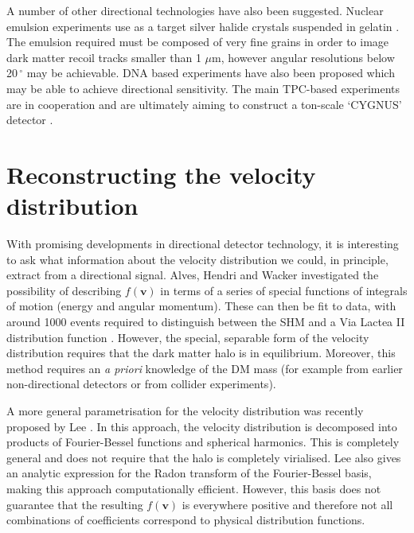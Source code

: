 

A number of other directional technologies have also been suggested. Nuclear emulsion experiments use as a target silver halide crystals suspended in gelatin \cite{Naka:2012}. The emulsion required must be composed of very fine grains in order to image dark matter recoil tracks smaller than 1 $\mu \textrm{m}$, however angular resolutions below 20$\,^{\circ}$ may be achievable. DNA based experiments \cite{Drukier:2012} have also been proposed which may be able to achieve directional sensitivity. The main TPC-based experiments are in cooperation and are ultimately aiming to construct a ton-scale `CYGNUS' detector \cite{Ahlen:2009}.


\section{Reconstructing the velocity distribution}

With promising developments in directional detector technology, it is interesting to ask what information about the velocity distribution we could, in principle, extract from a directional signal. Alves, Hendri and Wacker \cite{Alves:2012} investigated the possibility of describing $f(\textbf{v})$ in terms of a series of special functions of integrals of motion (energy and angular momentum). These can then be fit to data, with around 1000 events required to distinguish between the SHM and a Via Lactea II distribution function \cite{Kuhlen:2008}. However, the special, separable form of the velocity distribution requires that the dark matter halo is in equilibrium. Moreover, this method requires an \textit{a priori} knowledge of the DM mass (for example from earlier non-directional detectors or from collider experiments).

A more general parametrisation for the velocity distribution was recently proposed by Lee \cite{Lee:2014}. In this approach, the velocity distribution is decomposed into products of Fourier-Bessel functions and spherical harmonics. This is completely general and does not require that the halo is completely virialised. Lee also gives an analytic expression for the Radon transform of the Fourier-Bessel basis, making this approach computationally efficient. However, this basis does not guarantee that the resulting $f(\textbf{v})$ is everywhere positive and therefore not all combinations of coefficients correspond to physical distribution functions. 

